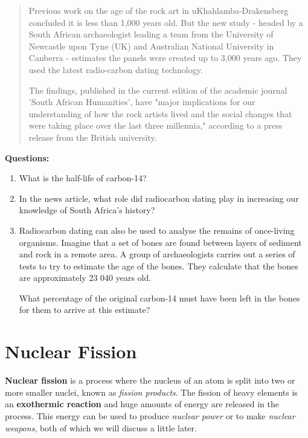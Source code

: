 \begin{itemize}
{\begin{quote}
Previous work on the age of the rock art in uKhahlamba-Drakensberg concluded it is less than 1,000 years old. But the new study - headed by a South African archaeologist leading a team from the University of Newcastle upon Tyne (UK) and Australian National University in Canberra - estimates the panels were created up to 3,000 years ago. They used the latest radio-carbon dating technology.

The findings, published in the current edition of the academic journal 'South African Humanities', have "major implications for our understanding of how the rock artists lived and the social changes that were taking place over the last three millennia," according to a press release from the British university. \\
\end{quote}

\textbf{Questions:}

\begin{enumerate}
\item{What is the half-life of carbon-14?}
\item{In the news article, what role did radiocarbon dating play in increasing our knowledge of South Africa's history?}
\item{Radiocarbon dating can also be used to analyse the remains of once-living organisms. Imagine that a set of bones are found between layers of sediment and rock in a remote area. A group of archaeologists carries out a series of tests to try to estimate the age of the bones. They calculate that the bones are approximately 23 040 years old.

What percentage of the original carbon-14 must have been left in the bones for them to arrive at this estimate?}
\end{enumerate}
}

\end{itemize}







\section{Nuclear Fission}
\label{sec:an:nfiss}

\textbf{Nuclear fission} is a process where the nucleus of an atom is split into two or more smaller nuclei, known as \textit{fission products}. The fission of heavy elements is an \textbf{exothermic reaction} and huge amounts of energy are released in the process. This energy can be used to produce \textit{nuclear power} or to make \textit{nuclear weapons}, both of which we will discuss a little later.

